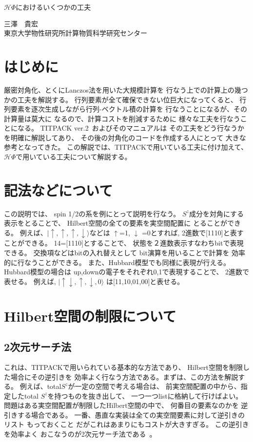 \documentclass[prb,aps,showpacs,preprint,nofootinbib]{revtex4}
\newcommand{\up}{\uparrow}
\newcommand{\down}{\downarrow}
\newcommand{\HPhi}{\mathcal{H}\Phi}
\begin{document}
\begin{center}\LARGE
$\mathcal H\Phi$におけるいくつかの工夫
\end{center}
\begin{flushright}\large
三澤　貴宏 \\
東京大学物性研究所計算物質科学研究センター
\end{flushright}

\section{はじめに}
\label{sec:intro}
厳密対角化、とくにLanczos法を用いた大規模計算を
行なう上での計算上の幾つかの工夫を解説する。
行列要素が全て確保できない位巨大になってくると、
行列要素を逐次生成しながら行列-ベクトル積の計算を
行なうことになるが、その計算量は莫大に
なるので、計算コストを削減するために
様々な工夫を行なうことになる。
TITPACK ver.2~\cite{titpack}およびそのマニュアルは
その工夫をどう行なうかを明確に解説してあり、
その後の対角化のコードを作成する人にとって
大きな参考となってきた。
この解説では、TITPACKで用いている工夫に付け加えて、
$\HPhi$で用いている工夫について解説する。

\section{記法などについて}
この説明では、
spin 1/2の系を例にとって説明を行なう。
$S^{z}$成分を対角にする表示をとることで、
Hilbert空間の全ての要素を実空間配置に
とることができる。
例えば、$|\up,\up,\up,\down\rangle$などは
$\up$=1, $\down$ =0とすれば,
2進数で[1110]と表すことができる。
14=[1110]とすることで、
状態を２進数表示すなわちbitで表現できる。
交換項などはbitの入れ替えとして
bit演算を用いることで計算を
効率的に行なうことができる。
また、Hubbard模型でも同様に表現が行える。
Hubbard模型の場合は
up,downの電子をそれぞれ0,1で表現することで、
2進数で表せる。
例えば, $|\up\down,\up,\down,0\rangle$
は[11,10,01,00]と表せる。


\section{Hilbert空間の制限について}
\subsection{2次元サーチ法}
\label{sec:OgataLin}
これは、TITPACKで用いられている基本的な方法であり、
Hilbert空間を制限した場合にその逆引きを
効率よく行なう方法である。まずは、この方法を解説する。
例えば、total$S^z$が一定の空間で考える場合は、
前実空間配置の中から、指定したtotal
$S^z$を持つものを抜き出して、
一つ一つlistに格納して行けばよい。
問題はある実空間配置が制限したHilbert空間の中で、
何番目の要素なのかを
逆引きする場合である。
一番、愚直な実装は全ての実空間要素に対して逆引きのリスト
もっておくこと
だがこれはあまりにもコストが大きすぎる。
この逆引きを効率よく
おこなうのが2次元サーチ法である~\cite{Lin,titpack}。
\end{document}
